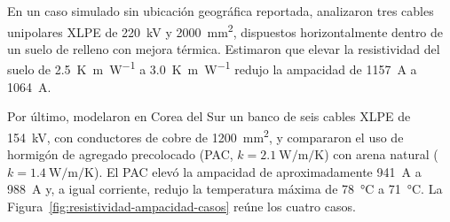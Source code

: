 \documentclass[11pt,a4paper,oneside]{report}
\begin{document}
En un caso simulado sin ubicación geográfica reportada, \textcite[15--16]{atoccsa2024} analizaron tres cables unipolares XLPE de \SI{220}{\kilo\volt} y \SI{2000}{\milli\metre\squared}, dispuestos horizontalmente dentro de un suelo de relleno con mejora térmica. Estimaron que elevar la resistividad del suelo de \SI{2.5}{\kelvin\metre\per\watt} a \SI{3.0}{\kelvin\metre\per\watt} redujo la ampacidad de \SI{1157}{\ampere} a \SI{1064}{\ampere}.

Por último, \textcite[12--16]{kim2025} modelaron en Corea del Sur un banco de seis cables XLPE de \SI{154}{\kilo\volt}, con conductores de cobre de \SI{1200}{\milli\metre\squared}, y compararon el uso de hormigón de agregado precolocado (PAC, $k=\SI{2.1}{\watt\per\metre\per\kelvin}$) con arena natural ($k=\SI{1.4}{\watt\per\metre\per\kelvin}$). El PAC elevó la ampacidad de aproximadamente \SI{941}{\ampere} a \SI{988}{\ampere} y, a igual corriente, redujo la temperatura máxima de \SI{78}{\celsius} a \SI{71}{\celsius}. La Figura~\ref{fig:resistividad-ampacidad-casos} reúne los cuatro casos.
\end{document}
